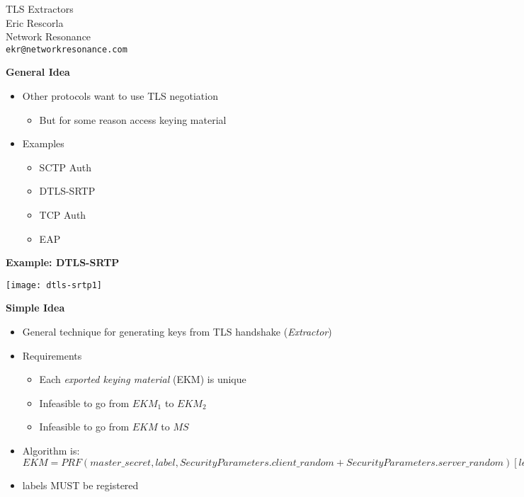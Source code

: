 \documentclass[helvetica]{seminar}
\newcommand{\heading}[1]{%
  \begin{center} 
    \large\bf 
    #1 
  \end{center} 
  \vspace{.4 in}}
\begin{document}
        
\begin{slide}
\begin{center}
\LARGE{{\bf}TLS Extractors}\\

\vspace{.3 in}
\large{Eric Rescorla}\\
\large{Network Resonance}\\
\large{\texttt{ekr@networkresonance.com}}

\end{center}
\end{slide}


\begin{slide}
\heading{General Idea}

\begin{itemize}
\item Other protocols want to use TLS negotiation
\begin{itemize}
\item But for some reason access keying material
\end{itemize}
\item Examples
\begin{itemize}
\item SCTP Auth
\item DTLS-SRTP
\item TCP Auth
\item EAP
\end{itemize}
\end{itemize}

\end{slide}


\begin{slide}
\heading{Example: DTLS-SRTP}

\vspace{-.4 in}
\texttt{[image: dtls-srtp1]}

\end{slide}


\begin{slide}
\heading{Simple Idea}

\begin{itemize}
\item General technique for generating keys from TLS handshake (\emph{Extractor})
\item Requirements
\begin{itemize}
\item Each \emph{exported keying material} (EKM) is unique
\item Infeasible to go from $EKM_1$ to $EKM_2$
\item Infeasible to go from $EKM$ to $MS$
\end{itemize}
\item Algorithm is: $EKM = PRF(master\_secret, label,
              SecurityParameters.client\_random +
              SecurityParameters.server\_random)[length])$
\item labels MUST be registered
\end{itemize}
\end{slide}
\end{document}
